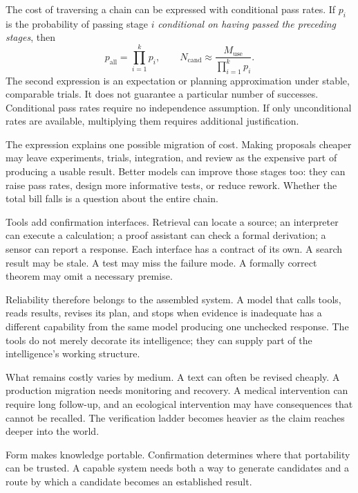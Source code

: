 The cost of traversing a chain can be expressed with conditional pass rates. If $p_i$ is the probability of passing stage $i$ \emph{conditional on having passed the preceding stages}, then
\begin{equation}
 p_{\mathrm{all}}=\prod_{i=1}^{k}p_i,
 \qquad
 N_{\mathrm{cand}}\approx
 \frac{M_{\mathrm{use}}}{\prod_{i=1}^{k}p_i}.
\end{equation}
The second expression is an expectation or planning approximation under stable, comparable trials. It does not guarantee a particular number of successes. Conditional pass rates require no independence assumption. If only unconditional rates are available, multiplying them requires additional justification.

The expression explains one possible migration of cost. Making proposals cheaper may leave experiments, trials, integration, and review as the expensive part of producing a usable result. Better models can improve those stages too: they can raise pass rates, design more informative tests, or reduce rework. Whether the total bill falls is a question about the entire chain.

Tools add confirmation interfaces. Retrieval can locate a source; an interpreter can execute a calculation; a proof assistant can check a formal derivation; a sensor can report a response. Each interface has a contract of its own. A search result may be stale. A test may miss the failure mode. A formally correct theorem may omit a necessary premise.

Reliability therefore belongs to the assembled system. A model that calls tools, reads results, revises its plan, and stops when evidence is inadequate has a different capability from the same model producing one unchecked response. The tools do not merely decorate its intelligence; they can supply part of the intelligence's working structure.

What remains costly varies by medium. A text can often be revised cheaply. A production migration needs monitoring and recovery. A medical intervention can require long follow-up, and an ecological intervention may have consequences that cannot be recalled. The verification ladder becomes heavier as the claim reaches deeper into the world.

Form makes knowledge portable. Confirmation determines where that portability can be trusted. A capable system needs both a way to generate candidates and a route by which a candidate becomes an established result.
